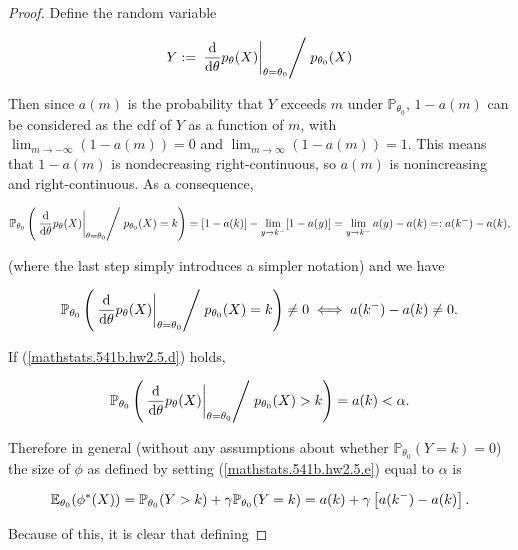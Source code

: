\begin{proof}
Define the random variable

\[
Y :=  \left. \left.  \deriv{}{\theta} p_\theta(X) \right|_{\theta = \theta_0}  \middle/ \right.  p_{\theta_0}(X)
\]

Then since \(a(m)\) is the probability that \(Y\) exceeds \(m\) under \(\mathbb{P}_{\theta_0}\), \(1 -a(m)\) can be considered as the cdf of \(Y\) as a function of \(m\), with \(\lim_{m \to -\infty} ( 1 - a(m)) = 0\) and \(\lim_{m \to \infty} ( 1 - a(m)) = 1\). This means that \(1 - a(m)\) is nondecreasing right-continuous, so \(a(m)\) is nonincreasing and right-continuous. As a consequence,


\[
\mathbb{P}_{\theta_0} \left(  \left. \left.  \deriv{}{\theta} p_\theta(X) \right|_{\theta = \theta_0}  \middle/ \right.  p_{\theta_0}(X) = k \right)
= [1 - a(k)] -  \lim_{y \to k^-} [ 1 - a(y)]  = \lim_{y \to k^-} a(y)  - a(k) =: a(k^-) - a(k),
\]

(where the last step simply introduces a simpler notation) and we have

\begin{equation}\label{mathstats.541b.hw2.5.d}
\mathbb{P}_{\theta_0} \left(  \left. \left.  \deriv{}{\theta} p_\theta(X) \right|_{\theta = \theta_0}  \middle/ \right.  p_{\theta_0}(X) = k \right) \neq 0 \iff a(k^-) - a(k) \neq 0.
\end{equation}

If (\ref{mathstats.541b.hw2.5.d}) holds,

\[
 \mathbb{P}_{\theta_0} \left(  \left. \left.  \deriv{}{\theta} p_\theta(X) \right|_{\theta = \theta_0}  \middle/ \right.  p_{\theta_0}(X) > k \right) =  a(k) < \alpha .
\]

Therefore in general (without any assumptions about whether \(\mathbb{P}_{\theta_0} (Y = k)  = 0\)) the size of \(\phi\) as defined by setting (\ref{mathstats.541b.hw2.5.e}) equal to \(\alpha\) is 

\[
\E_{\theta_0} (\phi^*(X)) =  \mathbb{P}_{\theta_0}(Y > k) + \gamma  \mathbb{P}_{\theta_0}(Y = k) 
 = a(k) + \gamma \left[ a(k^-) - a(k)  \right].
\]

Because of this, it is clear that defining 


\end{proof}
